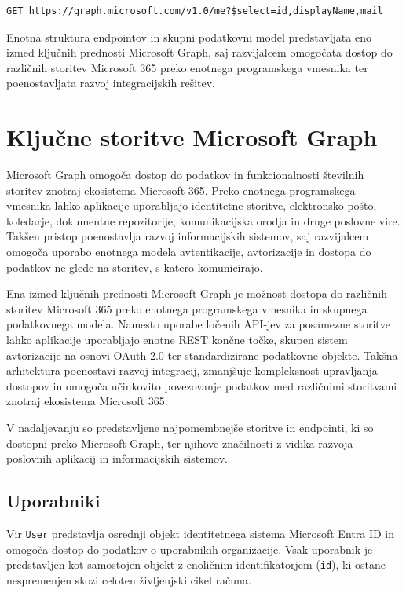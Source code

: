 \documentclass[a4paper, 12pt]{book}
\begin{document}
\begin{verbatim}
GET https://graph.microsoft.com/v1.0/me?$select=id,displayName,mail
\end{verbatim}


Enotna struktura endpointov in skupni podatkovni model predstavljata eno izmed ključnih prednosti Microsoft Graph, saj razvijalcem omogočata dostop do različnih storitev Microsoft 365 preko enotnega programskega vmesnika ter poenostavljata razvoj integracijskih rešitev.


\section{Ključne storitve Microsoft Graph}

Microsoft Graph omogoča dostop do podatkov in funkcionalnosti številnih storitev znotraj ekosistema Microsoft 365.
Preko enotnega programskega vmesnika lahko aplikacije uporabljajo identitetne storitve, elektronsko pošto, koledarje, dokumentne repozitorije, komunikacijska orodja in druge poslovne vire.
Takšen pristop poenostavlja razvoj informacijskih sistemov, saj razvijalcem omogoča uporabo enotnega modela avtentikacije, avtorizacije in dostopa do podatkov ne glede na storitev, s katero komunicirajo.

Ena izmed ključnih prednosti Microsoft Graph je možnost dostopa do različnih storitev Microsoft 365 preko enotnega programskega vmesnika in skupnega podatkovnega modela. Namesto uporabe ločenih API-jev za posamezne storitve lahko aplikacije uporabljajo enotne REST končne točke, skupen sistem avtorizacije na osnovi OAuth 2.0 ter standardizirane podatkovne objekte. Takšna arhitektura poenostavi razvoj integracij, zmanjšuje kompleksnost upravljanja dostopov in omogoča učinkovito povezovanje podatkov med različnimi storitvami znotraj ekosistema Microsoft 365.

V nadaljevanju so predstavljene najpomembnejše storitve in endpointi, ki so dostopni preko Microsoft Graph, ter njihove značilnosti z vidika razvoja poslovnih aplikacij in informacijskih sistemov.

\subsection{Uporabniki}

Vir \texttt{User} predstavlja osrednji objekt identitetnega sistema Microsoft Entra ID in omogoča dostop do podatkov o uporabnikih organizacije. Vsak uporabnik je predstavljen kot samostojen objekt z enoličnim identifikatorjem (\texttt{id}), ki ostane nespremenjen skozi celoten življenjski cikel računa.
\end{document}
